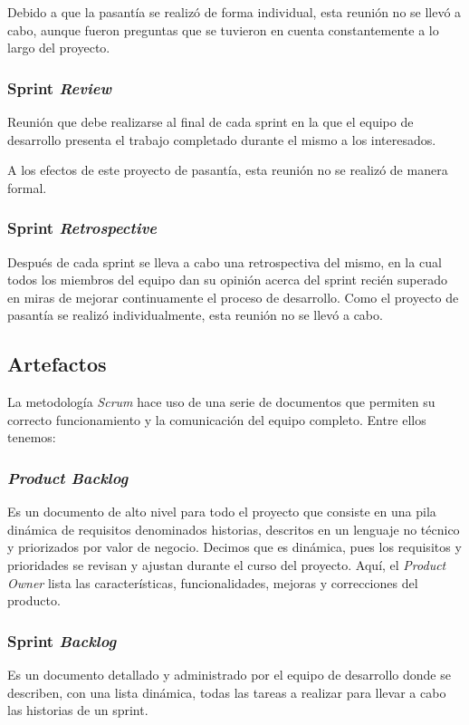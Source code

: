Debido a que la pasantía se realizó de forma individual, esta reunión no se llevó a cabo, aunque fueron preguntas que se tuvieron en cuenta constantemente a lo largo del proyecto.

\subsubsection{Sprint \emph{Review}}
Reunión que debe realizarse al final de cada sprint en la que el equipo de desarrollo presenta el trabajo completado durante el mismo a los interesados.

A los efectos de este proyecto de pasantía, esta reunión no se realizó de manera formal.

\subsubsection{Sprint \emph{Retrospective}}
Después de cada sprint se lleva a cabo una retrospectiva del mismo, en la cual todos los miembros del equipo dan su opinión acerca del sprint recién superado en miras de mejorar continuamente el proceso de desarrollo. Como el proyecto de pasantía se realizó individualmente, esta reunión no se llevó a cabo.

\subsection{Artefactos}
La metodología \emph{Scrum} hace uso de una serie de documentos que permiten su correcto funcionamiento y la comunicación del equipo completo. Entre ellos tenemos:

\subsubsection{\emph{Product Backlog}}
Es un documento de alto nivel para todo el proyecto que consiste en una pila dinámica de requisitos denominados historias, descritos en un lenguaje no técnico y priorizados por valor de negocio. Decimos que es dinámica, pues los requisitos y prioridades se revisan y ajustan durante el curso del proyecto. Aquí, el \emph{Product Owner} lista las características, funcionalidades, mejoras y correcciones del producto.

\subsubsection{Sprint \emph{Backlog}}
Es un documento detallado y administrado por el equipo de desarrollo donde se describen, con una lista dinámica, todas las tareas a realizar para llevar a cabo las historias de un sprint.

